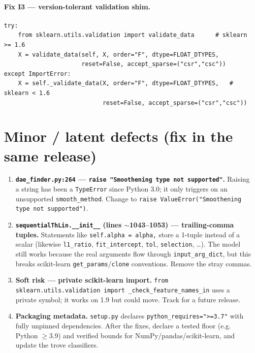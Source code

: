 \documentclass[11pt]{article}
\newcommand{\code}[1]{\texttt{\small #1}}
\begin{document}
\paragraph{Fix I3 --- version-tolerant validation shim.}
\begin{lstlisting}
try:
    from sklearn.utils.validation import validate_data      # sklearn >= 1.6
    X = validate_data(self, X, order="F", dtype=FLOAT_DTYPES,
                      reset=False, accept_sparse=("csr","csc"))
except ImportError:
    X = self._validate_data(X, order="F", dtype=FLOAT_DTYPES,   # sklearn < 1.6
                            reset=False, accept_sparse=("csr","csc"))
\end{lstlisting}

\section{Minor / latent defects (fix in the same release)}
\label{sec:minor}

\begin{enumerate}[itemsep=2pt]
  \item \textbf{\code{dae\_finder.py:264} --- \code{raise "Smoothening type not supported"}.}
        Raising a string has been a \code{TypeError} since Python 3.0; it only
        triggers on an unsupported \code{smooth\_method}. Change to
        \code{raise ValueError("Smoothening type not supported")}.
  \item \textbf{\code{sequentialThLin.\_\_init\_\_} (lines $\sim$1043--1053) ---
        trailing-comma tuples.} Statements like \code{self.alpha = alpha,} store a
        1-tuple instead of a scalar (likewise \code{l1\_ratio}, \code{fit\_intercept},
        \code{tol}, \code{selection}, \dots). The model still works because the real
        arguments flow through \code{input\_arg\_dict}, but this breaks
        scikit-learn \code{get\_params}/\code{clone} conventions. Remove the stray
        commas.
  \item \textbf{Soft risk --- private scikit-learn import.}
        \code{from sklearn.utils.validation import \_check\_feature\_names\_in}
        uses a private symbol; it works on 1.9 but could move. Track for a future
        release.
  \item \textbf{Packaging metadata.} \code{setup.py} declares
        \code{python\_requires=">=3.7"} with fully unpinned dependencies. After the
        fixes, declare a tested floor (e.g. Python $\ge$3.9) and verified bounds
        for NumPy/pandas/scikit-learn, and update the trove classifiers.
\end{enumerate}
\end{document}
